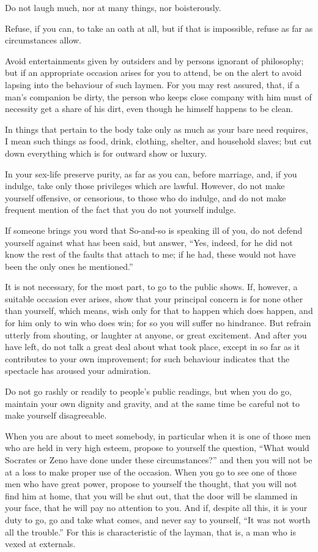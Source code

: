 Do not laugh much, nor at many things, nor boisterously.

Refuse, if you can, to take an oath at all, but if that is impossible, refuse as far as circumstances allow.

Avoid entertainments given by outsiders and by persons ignorant of philosophy; but if an appropriate occasion arises for you to attend, be on the alert to avoid lapsing into the behaviour of such laymen. For you may rest assured, that, if a man's companion be dirty, the person who keeps close company with him must of necessity get a share of his dirt, even though he himself happens to be clean.

In things that pertain to the body take only as much as your bare need requires, I mean such things as food, drink, clothing, shelter, and household slaves; but cut down everything which is for outward show or luxury.

In your sex-life preserve purity, as far as you can, before marriage, and, if you indulge, take only those privileges which are lawful. However, do not make yourself offensive, or censorious, to those who do indulge, and do not make frequent mention of the fact that you do not yourself indulge.

If someone brings you word that So-and-so is speaking ill of you, do not defend yourself against what has been said, but answer, ``Yes, indeed, for he did not know the rest of the faults that attach to me; if he had, these would not have been the only ones he mentioned.''

It is not necessary, for the most part, to go to the public shows. If, however, a suitable occasion ever arises, show that your principal concern is for none other than yourself, which means, wish only for that to happen which does happen, and for him only to win who does win; for so you will suffer no hindrance. But refrain utterly from shouting, or laughter at anyone, or great excitement. And after you have left, do not talk a great deal about what took place, except in so far as it contributes to your own improvement; for such behaviour indicates that the spectacle has aroused your admiration.

Do not go rashly or readily to people's public readings, but when you do go, maintain your own dignity and gravity, and at the same time be careful not to make yourself disagreeable.

When you are about to meet somebody, in particular when it is one of those men who are held in very high esteem, propose to yourself the question, ``What would Socrates or Zeno have done under these circumstances?'' and then you will not be at a loss to make proper use of the occasion. When you go to see one of those men who have great power, propose to yourself the thought, that you will not find him at home, that you will be shut out, that the door will be slammed in your face, that he will pay no attention to you. And if, despite all this, it is your duty to go, go and take what comes, and never say to yourself, ``It was not worth all the trouble.'' For this is characteristic of the layman, that is, a man who is vexed at externals.

